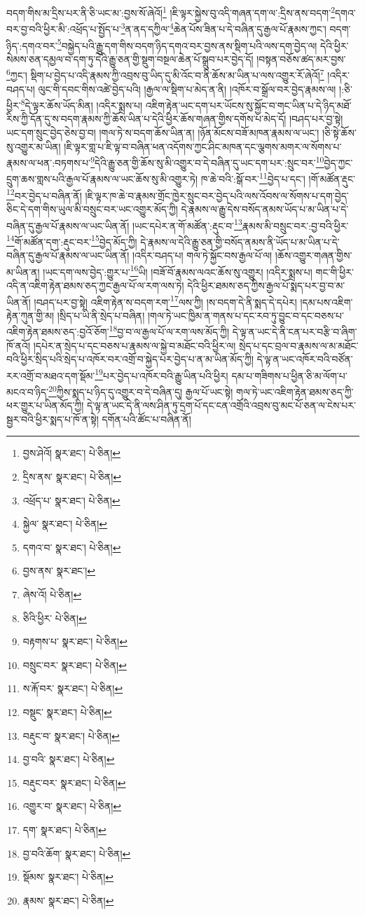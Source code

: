 བདག་གིས་མ་དྲིས་པར་ནི་ཅི་ཡང་མ་:བྱས་སོ་ཞེའོ།\footnote{བྱས་ཤེའོ།  སྣར་ཐང་།  པེ་ཅིན། } །ཇི་ལྟར་སྐྱེས་བུ་འདི་གཞན་དག་ལ་:དྲིས་ནས་བདག་\footnote{དྲིས་ནས་  སྣར་ཐང་།  པེ་ཅིན། }དགའ་བར་བྱ་བའི་ཕྱིར་མི་:འཕྲོད་པ་སྤྱོད་པ་\footnote{འཕྲོད་པ་  སྣར་ཐང་།  པེ་ཅིན། }ན་ནད་དཀྱིལ་\footnote{སྐྱེལ་  སྣར་ཐང་།  པེ་ཅིན། }ཆེན་པོས་ཟིན་པ་དེ་བཞིན་དུ་རྒྱལ་པོ་རྣམས་ཀྱང་། བདག་ཉིད་:དགའ་བར་\footnote{དགའ་བ་  སྣར་ཐང་།  པེ་ཅིན། }བསྐྱེད་པའི་རྒྱུ་དག་གིས་བདག་ཉིད་དགའ་བར་བྱས་ནས་སྡིག་པའི་ལས་དག་བྱེད་ལ། དེའི་ཕྱིར་སེམས་ཅན་དམྱལ་བ་དག་ཏུ་དེའི་རྒྱུ་ཅན་གྱི་སྡུག་བསྔལ་ཆེན་པོ་སྒྲུབ་པར་བྱེད་དོ། །བསྟན་བཅོས་ཚད་མར་བྱས་\footnote{བྱས་ནས་  སྣར་ཐང་། }ཀྱང་། སྡིག་པ་བྱེད་པ་འདི་རྣམས་ཀྱི་འབྲས་བུ་ཡིད་དུ་མི་འོང་བ་ནི་ཆོས་མ་ཡིན་པ་ལས་འགྱུར་རོ་ཞེའོ།\footnote{ཞེས་འོ།  པེ་ཅིན། } །འདིར་བཤད་པ། ལུང་གི་དབང་གིས་འཚེ་བྱེད་པའི། །རྒྱལ་ལ་སྡིག་པ་མེད་ན་ནི། །འཁོར་བ་སྒྲོལ་བར་བྱེད་རྣམས་ལ། །:ཅི་ཕྱིར་\footnote{ཅིའི་ཕྱིར་  པེ་ཅིན། }དེ་ལྟར་ཆོས་ཡོད་མིན། །འདིར་སྨྲས་པ། འཇིག་རྟེན་ཡང་དག་པར་ཡོངས་སུ་སྐྱོང་བ་གང་ཡིན་པ་དེ་ཉིད་མཐོ་རིས་ཀྱི་དོན་དུ་ས་བདག་རྣམས་ཀྱི་ཆོས་ཡིན་པ་དེའི་ཕྱིར་ཆོས་གཞན་གྱིས་དགོས་པ་མེད་དོ། །བཤད་པར་བྱ་སྟེ། ཡང་དག་སྲུང་བྱེད་ཅེས་བྱ་བ། །གལ་ཏེ་ས་བདག་ཆོས་ཡིན་ན། །ཉོན་མོངས་བཟོ་མཁན་རྣམས་ལ་ཡང་། །ཅི་སྟེ་ཆོས་སུ་འགྱུར་མ་ཡིན། །ཇི་ལྟར་གླ་པ་ཇི་ལྟ་བ་བཞིན་ཕན་འདོགས་ཀྱང་ཤིང་མཁན་དང་ལྕགས་མགར་ལ་སོགས་པ་རྣམས་ལ་ཕན་:བཏགས་པ་\footnote{བརྟགས་པ་  སྣར་ཐང་།  པེ་ཅིན། }དེའི་རྒྱུ་ཅན་གྱི་ཆོས་སུ་མི་འགྱུར་བ་དེ་བཞིན་དུ་ཡང་དག་པར་:སྲུང་བར་\footnote{བསྲུང་བར་  སྣར་ཐང་།  པེ་ཅིན། }བྱེད་ཀྱང་དྲུག་ཆས་གླས་པའི་རྒྱལ་པོ་རྣམས་ལ་ཡང་ཆོས་སུ་མི་འགྱུར་ཏེ། ཁ་ཆེ་བའི་:སྒོ་བར་\footnote{ས་རྐོ་བར་  སྣར་ཐང་།  པེ་ཅིན། }བྱེད་པ་དང་། །གོ་མཚོན་རྡུང་\footnote{བསྡུང་  སྣར་ཐང་།  པེ་ཅིན། }བར་བྱེད་པ་བཞིན་ནོ། །ཇི་ལྟར་ཁ་ཆེ་བ་རྣམས་གྲོང་ཁྱེར་སྲུང་བར་བྱེད་པའི་ལས་འོབས་ལ་སོགས་པ་དག་བྱེད་ཅིང་དེ་དག་གིས་ཡུལ་མི་བསྲུང་བར་ཡང་འགྱུར་མོད་ཀྱི། དེ་རྣམས་ལ་རྒྱུ་དེས་བསོད་ནམས་ཡོད་པ་མ་ཡིན་པ་དེ་བཞིན་དུ་རྒྱལ་པོ་རྣམས་ལ་ཡང་ཡིན་ནོ། །ཡང་དཔེར་ན་གོ་མཚོན་:རྡུང་བ་\footnote{བརྡུང་བ་  སྣར་ཐང་།  པེ་ཅིན། }རྣམས་མི་བསྲུང་བར་:བྱ་བའི་ཕྱིར་\footnote{བྱ་བའི་  སྣར་ཐང་།  པེ་ཅིན། }གོ་མཚོན་དག་:རྡུང་བར་\footnote{བརྡུང་བར་  སྣར་ཐང་།  པེ་ཅིན། }བྱེད་མོད་ཀྱི། དེ་རྣམས་ལ་དེའི་རྒྱུ་ཅན་གྱི་བསོད་ནམས་ནི་ཡོད་པ་མ་ཡིན་པ་དེ་བཞིན་དུ་རྒྱལ་པོ་རྣམས་ལ་ཡང་ཡིན་ནོ། །འདིར་བཤད་པ། གལ་ཏེ་སྐྱོང་བས་རྒྱལ་པོ་ལ། །ཆོས་འགྱུར་གཞན་གྱིས་མ་ཡིན་ན། །ཡང་དག་ལས་བྱེད་:གྱུར་པ་\footnote{འགྱུར་བ་  སྣར་ཐང་།  པེ་ཅིན། }ཡི། །བཟོ་བོ་རྣམས་ལའང་ཆོས་སུ་འགྱུར། །འདིར་སྨྲས་པ། གང་གི་ཕྱིར་འདི་ན་འཇིག་རྟེན་ཐམས་ཅད་ཀྱང་རྒྱལ་པོ་ལ་རག་ལས་ཏེ། དེའི་ཕྱིར་ཐམས་ཅད་ཀྱིས་རྒྱལ་པོ་སྨད་པར་བྱ་བ་མ་ཡིན་ནོ། །བཤད་པར་བྱ་སྟེ། འཇིག་རྟེན་ས་བདག་རག་\footnote{དག་  སྣར་ཐང་།  པེ་ཅིན། }ལས་ཀྱི། །ས་བདག་དེ་ནི་སྨད་དེ་དཔེར། །དམ་པས་འཇིག་རྟེན་ཀུན་གྱི་མ། །སྲིད་པ་ཡི་ནི་སྲེད་པ་བཞིན། །གལ་ཏེ་ཡང་ཁྱིམ་ན་གནས་པ་དང་རབ་ཏུ་བྱུང་བ་དང་བཅས་པ་འཇིག་རྟེན་ཐམས་ཅད་:བྱའོ་ཅོག་\footnote{བྱ་བའི་ཆོག་  སྣར་ཐང་།  པེ་ཅིན། }བྱ་བ་ལ་རྒྱལ་པོ་ལ་རག་ལས་མོད་ཀྱི། དེ་ལྟ་ན་ཡང་དེ་ནི་ངན་པར་བརྩི་བ་ཞིག་ཁོ་ནའོ། །དཔེར་ན་སྲེད་པ་དང་བཅས་པ་རྣམས་ལ་སྐྱེ་བ་མཐོང་བའི་ཕྱིར་ལ། སྲེད་པ་དང་བྲལ་བ་རྣམས་ལ་མ་མཐོང་བའི་ཕྱིར་སྲིད་པའི་སྲེད་པ་འཁོར་བར་འགྲོ་བ་སྐྱེད་པར་བྱེད་པ་ན་མ་ཡིན་མོད་ཀྱི། དེ་ལྟ་ན་ཡང་འཁོར་བའི་བཙོན་རར་འགྲོ་བ་མཐའ་དག་སྡོམ་\footnote{སྡོམས་  སྣར་ཐང་།  པེ་ཅིན། }པར་བྱེད་པ་འཁོར་བའི་རྒྱུ་ཡིན་པའི་ཕྱིར། དམ་པ་གཟིགས་པ་ཕྱིན་ཅི་མ་ལོག་པ་མངའ་བ་ཉིད་\footnote{རྣམས་  སྣར་ཐང་།  པེ་ཅིན། }ཀྱིས་སྨད་པ་ཉིད་དུ་འགྱུར་བ་དེ་བཞིན་དུ། རྒྱལ་པོ་ཡང་སྟེ། གལ་ཏེ་ཡང་འཇིག་རྟེན་ཐམས་ཅད་ཀྱི་ཕར་གྱུར་པ་ཡིན་མོད་ཀྱི། དེ་ལྟ་ན་ཡང་དེ་ནི་ལས་ཤིན་ཏུ་དྲག་པོ་དང་ངན་འགྲོའི་འབྲས་བུ་མང་པོ་ཅན་ལ་ངེས་པར་སྦྱར་བའི་ཕྱིར་སྨད་པ་ཁོ་ན་སྟེ། དགོན་པའི་ཚོང་པ་བཞིན་ནོ། 